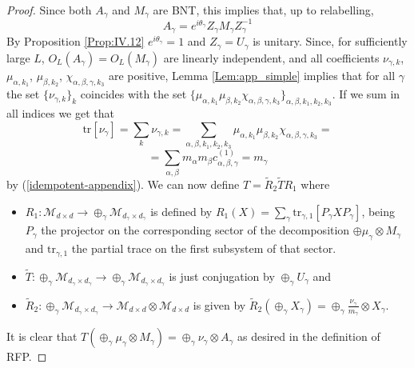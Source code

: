 \documentclass{elsarticle}
\newcommand{\be}{\begin{equation}}
\newcommand{\ee}{\end{equation}}
\newcommand{\tr}{\mathrm{tr}}
\begin{document}
\begin{proof}
Since both $A_\gamma$ and $M_\gamma$ are BNT, this implies that, up to relabelling,
\be
A_\gamma = e^{i\theta_\gamma} Z_\gamma M_\gamma Z_\gamma^{-1}
\ee
By Proposition \ref{Prop:IV.12} $e^{i\theta_\gamma}=1$ and $Z_\gamma=U_\gamma$ is unitary.
 Since, for sufficiently large $L$, $O_L(A_\gamma)=O_L(M_\gamma)$ are linearly independent, and all coefficients $\nu_{\gamma,k}$, $\mu_{\alpha,k_1}$, $\mu_{\beta,k_2}$, $\chi_{\alpha,\beta,\gamma,k_3}$ are positive, Lemma \ref{Lem:app_simple} implies that for all $\gamma$ the set $\{\nu_{\gamma,k}\}_k$ coincides with the set $\{\mu_{\alpha,k_1}\mu_{\beta,k_2}\chi_{\alpha,\beta,\gamma,k_3}\}_{\alpha,\beta,k_1,k_2,k_3}$. If we sum in all indices we get that
 \be
 \tr[\nu_\gamma]=\sum_k\nu_{\gamma,k}=\sum_{\alpha,\beta,k_1,k_2,k_3}\mu_{\alpha,k_1}\mu_{\beta,k_2}\chi_{\alpha,\beta,\gamma,k_3}=
 \ee
 \be
 = \sum_{\alpha,\beta} m_\alpha m_\beta c_{\alpha,\beta,\gamma}^{(1)}=m_\gamma
 \ee
 by (\ref{idempotent-appendix}). We can now define $T=\tilde{R}_2\tilde{T}R_1$  where
 \begin{itemize}
 \item $R_1:\mathcal{M}_{d\times d}\longrightarrow \oplus_\gamma\mathcal{M}_{d_\gamma\times d_\gamma}$
 is defined by  $R_1(X)=\sum_\gamma \tr_{\gamma,1}[P_\gamma X P_\gamma]$, being $P_\gamma$ the projector on the corresponding sector of the decomposition $\oplus \mu_\gamma\otimes M_\gamma$ and $\tr_{\gamma,1}$ the partial trace on the first subsystem of that sector.
 \item $\tilde{T}:\oplus_\gamma\mathcal{M}_{d_\gamma\times d_\gamma}\longrightarrow \oplus_\gamma\mathcal{M}_{d_\gamma\times d_\gamma}$ is just conjugation by $\oplus_\gamma U_\gamma$ and
 \item $\tilde{R}_2: \oplus_\gamma\mathcal{M}_{d_\gamma\times d_\gamma}\longrightarrow \mathcal{M}_{d\times d}\otimes \mathcal{M}_{d\times d}$ is given by
 $\tilde{R}_2(\oplus_\gamma X_\gamma)= \oplus_\gamma \frac{\nu_\gamma}{m_\gamma} \otimes X_\gamma$.
 \end{itemize}

 It is clear that $T(\oplus_\gamma \mu_\gamma\otimes M_\gamma)=\oplus_\gamma \nu_\gamma \otimes A_\gamma$ as desired in the definition of RFP.


\end{proof}
\end{document}
